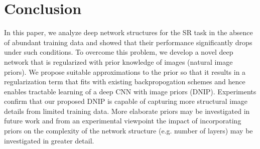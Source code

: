 \documentclass[9pt]{article}
\begin{document}
\section{Conclusion}

In this paper, we analyze deep network structures for the SR task in the absence of abundant training data and showed that their performance significantly drops under such conditions. To overcome this problem, we develop a novel deep network that is regularized with prior knowledge of images (natural image priors). We propose suitable approximations to the prior so that it results in a regularization term that fits with existing backpropogation schemes and hence enables tractable learning of a deep CNN with image priors (DNIP). Experiments confirm that our proposed DNIP is capable of capturing more structural image details from limited training data. More elaborate priors may be investigated in future work and from an experimental viewpoint the impact of incorporating priors on the complexity of the network structure (e.g. number of layers) may be investigated in greater detail.








\vfill\pagebreak

\small



\end{document}
